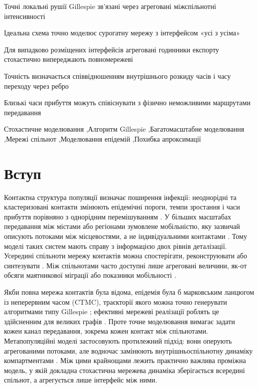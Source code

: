 \begin{highlights}
\item Точні локальні рушії Gillespie зв'язані через агреговані міжспільнотні інтенсивності
\item Ідеальна схема точно моделює сурогатну мережу з інтерфейсом «усі з усіма»
\item Для випадково розміщених інтерфейсів агреговані годинники експорту стохастично випереджають повномережеві
\item Точність визначається співвідношенням внутрішнього розкиду часів і часу переходу через ребро
\item Близькі часи прибуття можуть співіснувати з фізично неможливими маршрутами передавання
\end{highlights}

\begin{keywords}
Стохастичне моделювання \sep Алгоритм Gillespie \sep Багатомасштабне моделювання \sep Мережі спільнот \sep Моделювання епідемій \sep Похибка апроксимації
\end{keywords}

\maketitle

\section{Вступ}
\label{sec:introduction}

Контактна структура популяції визначає поширення інфекції: неоднорідні та кластеризовані контакти змінюють епідемічні пороги, темпи зростання і часи прибуття порівняно з однорідним перемішуванням \citep{keeling2005,pastorsatorras2015,kiss2017}. У більших масштабах передавання між містами або регіонами зумовлене мобільністю, яку зазвичай описують потоками між місцевостями, а не індивідуальними контактами \citep{balcan2009,barbosa2018human}. Тому моделі таких систем мають справу з інформацією двох рівнів деталізації. Усередині спільноти мережу контактів можна спостерігати, реконструювати або синтезувати \citep{eubank2004,danon2011}. Між спільнотами часто доступні лише агреговані величини, як-от обсяги маятникової міграції або показники мобільності \citep{barbosa2018human,chang2021}.

Якби повна мережа контактів була відома, епідемія була б марковським ланцюгом із неперервним часом (CTMC), траєкторії якого можна точно генерувати алгоритмами типу Gillespie \citep{gillespie1977exact,gibson2000}; ефективні мережеві реалізації роблять це здійсненним для великих графів \citep{vestergaard2015,kuryliak2025simulating}. Проте точне моделювання вимагає задати кожен канал передавання, зокрема кожен контакт між спільнотами. Метапопуляційні моделі застосовують протилежний підхід: вони оперують агрегованими потоками, але водночас замінюють внутрішньоспільнотну динаміку компартментами \citep{colizza2007reaction,colizza2008,balcan2010modeling,ajelli2010}. Між цими крайнощами лежить практично важлива проміжна модель, у якій докладна стохастична мережева динаміка зберігається всередині спільнот, а агрегується лише інтерфейс між ними.

